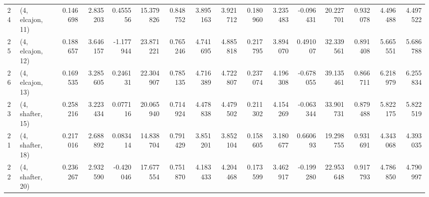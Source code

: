 \begin{tabular}{llrrrrrrrrrrrrrr}
24 &  (4, elcajon, 11) &   0.146698 &  2.835203 &  0.455556 &  15.379826 &  0.848752 &   3.895163 &  3.921712 &  0.180960 &  3.235483 & -0.096431 &   20.227701 &  0.932078 &   4.496488 &   4.497522 \\
25 &  (4, elcajon, 12) &   0.188657 &  3.646157 & -1.177944 &  23.871221 &  0.765246 &   4.741695 &  4.885818 &  0.217795 &  3.894070 &  0.491007 &   32.339561 &  0.891408 &   5.665551 &   5.686788 \\
26 &  (4, elcajon, 13) &   0.169535 &  3.285605 &  0.246131 &  22.304907 &  0.785135 &   4.716389 &  4.722807 &  0.237074 &  4.196308 & -0.678055 &   39.135461 &  0.866711 &   6.218979 &   6.255834 \\
23 &  (4, shafter, 15) &   0.258216 &  3.223434 &  0.077116 &  20.065940 &  0.714924 &   4.478838 &  4.479502 &  0.211302 &  4.154269 & -0.063344 &   33.901731 &  0.879488 &   5.822175 &   5.822519 \\
21 &  (4, shafter, 18) &   0.217016 &  2.688892 &  0.083414 &  14.838704 &  0.791429 &   3.851201 &  3.852104 &  0.158605 &  3.180677 &  0.660693 &   19.298755 &  0.931691 &   4.343068 &   4.393035 \\
22 &  (4, shafter, 20) &   0.236267 &  2.932590 & -0.420046 &  17.677554 &  0.751870 &   4.183433 &  4.204468 &  0.173599 &  3.462917 & -0.199280 &   22.953648 &  0.917793 &   4.786850 &   4.790997 \\
\bottomrule
\end{tabular}
